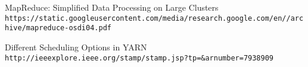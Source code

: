 \begin{thebibliography}{9}

MapReduce: Simplified Data Processing on Large Clusters
\\\texttt{https://static.googleusercontent.com/media/research.google.com/en//archive/mapreduce-osdi04.pdf}

Different Scheduling Options in YARN
\\\texttt{http://ieeexplore.ieee.org/stamp/stamp.jsp?tp=\&arnumber=7938909}

\end{thebibliography}
